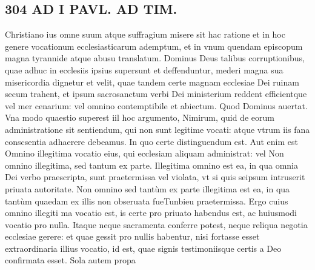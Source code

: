 \documentclass{article}
\begin{document}
\begin{pages}
\section*{304 AD I PAVL. AD TIM. }\pstart Christiano ius omne suum atque suffragium misere sit hac ratione et in hoc genere vocationum ecclesiasticarum ademptum, et in vnum quendam episcopum magna tyrannide atque abusu translatum. Dominus Deus talibus corruptionibus, quae adhuc in ecclesiis ipsius supersunt et deffenduntur, mederi magna sua misericordia dignetur et velit, quae tandem certe magnam ecclesiae Dei ruinam secum trahent, et ipsum sacrosanctum verbi Dei ministerium reddent efficientque vel mer cenarium: vel omnino contemptibile et abiectum. Quod Dominus auertat.  \pend\pstart Vna modo quaestio superest iil hoc argumento, Nimirum, quid de eorum administratione sit sentiendum, qui non sunt legitime vocati: atque vtrum iis fana conscsentia adhaerere debeamus. In quo certe distinguendum est. Aut enim est Omnino illegitima vocatio eius, qui ecclesiam aliquam administrat: vel Non omnino illegitima, sed tantum ex parte.  \pend\pstart Illegitima omnino est ea, in qua omnia Dei verbo praescripta, sunt praetermissa vel violata, vt si quis seipsum intruserit priuata autoritate. Non omnino sed tantùm ex parte illegitima est ea, in qua tantùm quaedam ex illis non obseruata fueTunbieu praetermissa. Ergo cuius omnino illegiti ma vocatio est, is certe pro priuato habendus est, ac huiusmodi vocatio pro nulla. Itaque neque sacramenta conferre potest, neque reliqua negotia ecclesiae gerere: et quae gessit pro nullis habentur, nisi fortasse esset extraordinaria illius vocatio, id est, quae signis testimoniisque certis a Deo confirmata esset. Sola autem propa\pend

\end{pages}
\end{document}
